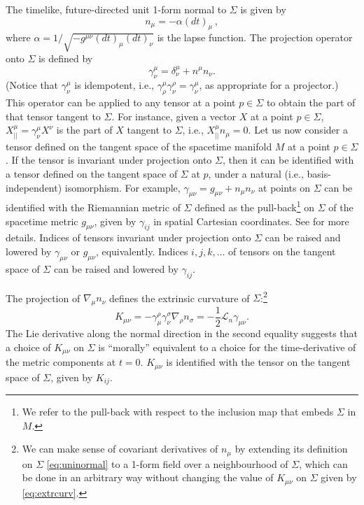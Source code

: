 \documentclass[aps,letterpaper,twocolumn,nofootinbib]{revtex4}
\numberwithin{equation}{section}
\begin{document}
The timelike, future-directed unit 1-form normal to $\Sigma$ is given by
\begin{equation}
\label{eq:uninormal}
n_\mu=-\alpha (dt)_\mu\,,
\end{equation}
where $\alpha=1/\sqrt{-g^{\mu\nu}(dt)_\mu (dt)_\nu}$ is the lapse function. 
The projection operator onto $\Sigma$ is defined by
\begin{equation}
\gamma^\mu_\nu=\delta^\mu_\nu+n^\mu n_\nu.
\end{equation}
(Notice that $\gamma^\mu_\nu$ is idempotent, i.e., $\gamma^\mu_\rho \gamma^\rho_\nu=\gamma^\mu_\nu$, as appropriate for a projector.)
This operator can be applied to any tensor at a point $p\in\Sigma$ to obtain the part of that tensor tangent to $\Sigma$. For instance, given a vector $X$ at a point $p\in\Sigma$, $X_{||}^\mu=\gamma^\mu_\nu X^\nu$ is the part of $X$ tangent to $\Sigma$, i.e., $X_{||}^\mu n_\mu=0$. 
Let us now consider a tensor defined on the tangent space of the spacetime manifold $M$ at a point $p\in\Sigma$. If the tensor is invariant under projection onto $\Sigma$, then it can be identified with a tensor defined on the tangent space of $\Sigma$ at $p$, under a natural (i.e., basis-independent) isomorphism. For example, $\gamma_{\mu\nu}=g_{\mu\nu}+n_\mu n_\nu$ at points on $\Sigma$ can be identified with the Riemannian metric of $\Sigma$ defined as the pull-back\footnote{We refer to the pull-back with respect to the inclusion map that embeds $\Sigma$ in $M$.} on $\Sigma$ of the spacetime metric $g_{\mu\nu}$, given by $\gamma_{ij}$ in spatial Cartesian coordinates. See \cite{Hawking:1973uf} for more details. Indices of tensors invariant under projection onto $\Sigma$ can be raised and lowered by $\gamma_{\mu\nu}$ or $g_{\mu\nu}$, equivalently. Indices $i,j,k,\dots$ of tensors on the tangent space of $\Sigma$ can be raised and lowered by $\gamma_{ij}$.

The projection of $\nabla_\mu n_\nu$ defines the extrinsic curvature of $\Sigma$:\footnote{We can make sense of covariant derivatives of $n_\mu$ by extending its definition on $\Sigma$ \eqref{eq:uninormal} to a 1-form field over a neighbourhood of $\Sigma$, which can be done in an arbitrary way without changing the value of $K_{\mu\nu}$ on $\Sigma$ given by \eqref{eq:extrcurv}.}
\begin{equation}
\label{eq:extrcurv}
K_{\mu\nu}=-\gamma^\rho_\mu \gamma^\sigma_\nu \nabla_\rho n_\sigma=-\frac{1}{2}\mathcal{L}_n\gamma_{\mu\nu}.
\end{equation}
The Lie derivative along the normal direction in the second equality suggests that a choice of $K_{\mu\nu}$ on $\Sigma$ is ``morally'' equivalent to a choice for the time-derivative of the metric components at $t=0$. $K_{\mu\nu}$ is identified with the tensor on the tangent space of $\Sigma$, given by $K_{ij}$.
\end{document}
